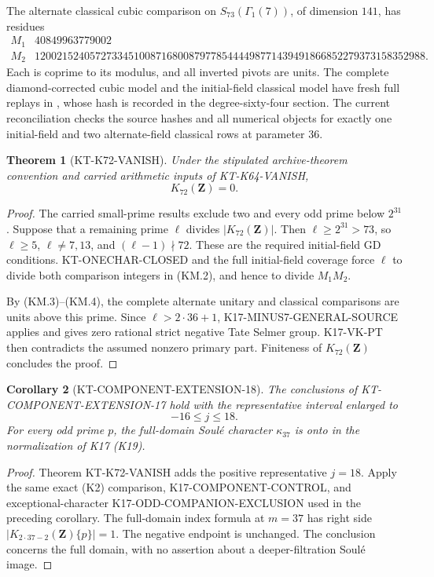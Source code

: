 \documentclass[11pt,a4paper]{article}
\newtheorem{theorem}{Theorem}[section]
\newtheorem{corollary}[theorem]{Corollary}
\theoremstyle{definition}
\begin{document}
The alternate classical cubic comparison on
$S_{73}(\Gamma_1(7))$, of dimension $141$, has residues
\[
\begin{array}{c|r}
 M_1&40849963779002\\
 M_2&12002152405727334510087168008797785444498771439491866852279373158352988.
\end{array}                                                     \tag{KM.4}
\]
Each is coprime to its modulus, and all inverted pivots
are units.  The complete diamond-corrected cubic model
and the initial-field classical model have fresh full
replays in , whose hash
is recorded in the degree-sixty-four section.  The current
reconciliation checks the source hashes and all numerical
objects for exactly one initial-field and two alternate-field
classical rows at parameter $36$.

\begin{theorem}[KT-K72-VANISH]
\label{thm:kt-k72-vanish}
Under the stipulated archive-theorem convention and
carried arithmetic inputs of KT-K64-VANISH,
\[
                              K_{72}(\mathbf Z)=0.
\]
\end{theorem}
\begin{proof}
The carried small-prime results exclude two and every odd
prime below $2^{31}$.  Suppose that a remaining prime
$\ell$ divides $|K_{72}(\mathbf Z)|$.  Then
$\ell\geq2^{31}>73$, so $\ell\geq5$, $\ell\ne7,13$,
and $(\ell-1)\nmid72$.  These are the required initial-field
GD conditions.  KT-ONECHAR-CLOSED and the full initial-field
coverage force $\ell$ to divide both comparison integers
in (KM.2), and hence to divide $M_1M_2$.

By (KM.3)--(KM.4), the complete alternate unitary and
classical comparisons are units above this prime.  Since
$\ell>2\cdot36+1$, K17-MINUS7-GENERAL-SOURCE applies
and gives zero rational strict negative Tate Selmer group.
K17-VK-PT then contradicts the assumed nonzero primary
part.  Finiteness of $K_{72}(\mathbf Z)$ concludes the proof.
\end{proof}

\begin{corollary}[KT-COMPONENT-EXTENSION-18]
The conclusions of KT-COMPONENT-EXTENSION-17 hold with
the representative interval enlarged to
\[
                             -16\leq j\leq18.
\]
For every odd prime $p$, the full-domain Soul\'e character
$\kappa_{37}$ is onto in the normalization of K17 (K19).
\end{corollary}
\begin{proof}
Theorem KT-K72-VANISH adds the positive representative
$j=18$.  Apply the same exact (K2) comparison,
K17-COMPONENT-CONTROL, and exceptional-character
K17-ODD-COMPANION-EXCLUSION used in the preceding
corollary.  The full-domain index formula at $m=37$ has
right side $|K_{2\cdot37-2}(\mathbf Z)\{p\}|=1$.
The negative endpoint is unchanged.  The conclusion
concerns the full domain, with no assertion about a
deeper-filtration Soul\'e image.
\end{proof}
\end{document}
